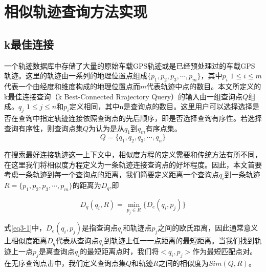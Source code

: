 

\theoremstyle{definition}
\newtheorem{definition}{定义}[section]

\chapter{相似轨迹查询方法实现}
\label{chap:implementation}

\section{k最佳连接}
\label{sec:k-bct}
一个轨迹数据库中存储了大量的原始车载GPS轨迹或是已经预处理过的车载GPS轨迹。这里的轨迹由一系列的地理位置点组成$\{p_{1},p_{2},p_{3},\cdots, p_{m}\}$，其中$p_{i}$ $1\leq i \leq m$代表一个由经度和维度构成的地理位置点而$m$代表轨迹中点的数目。本文所定义的k最佳连接查询（k Best-Connected Rrajectory Query）的输入由一组查询点$Q$组成。$q_{j}$ $1 \leq j \leq n$和$p_{i}$定义相同，其中n是查询点的数目。这里用户可以选择选择是否在查询中指定轨迹连接依照查询点的先后顺序，即是否选择查询有序性。若选择查询有序性，则查询点集$Q$为认为是从$q_{1}$到$q_{m}$有序点集。
\begin{displaymath}
	Q = \{q_{1},q_{2},q_{3},\cdots, q_{n}\}
\end{displaymath}

在搜索最好连接轨迹这一上下文中，相似度方程的定义需要和传统方法有所不同，在这里我们将相似度方程定义为一条轨迹连接查询点的好坏程度。因此，本文首要考虑一条轨迹到每一个查询点的距离，我们简要定义距离一个查询点$q_{i}$到一条轨迹$R=\{p_{1},p_{2},p_{3},\cdots, p_{m}\}$的距离为$D_{q}$,即

\begin{equation}
	\label{eq3-1}
	D_{q}(q_{i}, R) = \min_{p_{j} \in R} \{D_{e}(q_{i}, p_{j})\} 
\end{equation}

式\ref{eq3-1}中，$D_{e}(q_{i}, p_{j})$是指查询点$q_{i}$和轨迹点$p_{j}$之间的欧氏距离，因此通常意义上相似度距离$D_{q}$代表从查询点$q_{i}$到轨迹上任一一点距离的最短距离。当我们找到轨迹上一点$p_{j}$是离查询点$q_{i}$的最短距离点时，我们将$<q_{i},p_{j}>$作为最短匹配点对。在无序查询点击中，我们定义查询点集$Q$和轨迹$R$之间的相似度为$Sim(Q,R)$。

